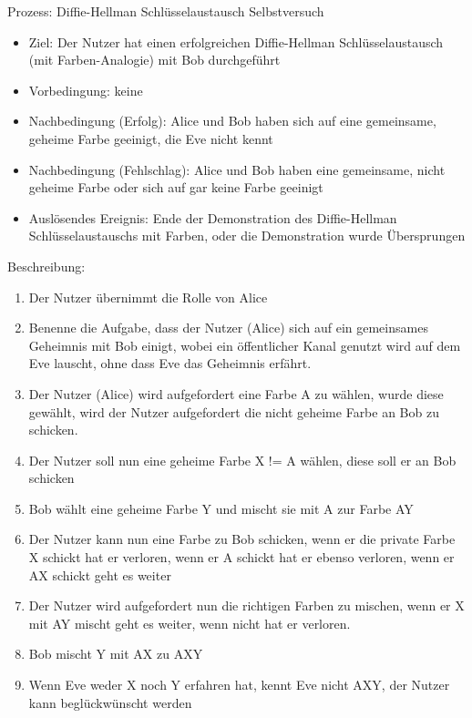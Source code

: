\documentclass{article}
\begin{document}
\begin{FA}[start=140]
\item Prozess: Diffie-Hellman Schlüsselaustausch Selbstversuch
\end{FA}
\begin{itemize}[label={}]
    \item Ziel: Der Nutzer hat einen erfolgreichen Diffie-Hellman Schlüsselaustausch
        (mit Farben-Analogie) mit Bob durchgeführt
    \item Vorbedingung: keine
    \item Nachbedingung (Erfolg): Alice und Bob haben sich auf eine
        gemeinsame, geheime Farbe geeinigt, die Eve nicht kennt
    \item Nachbedingung (Fehlschlag): Alice und Bob haben eine gemeinsame,
        nicht geheime Farbe oder sich auf gar keine Farbe geeinigt
    \item Auslösendes Ereignis: Ende der Demonstration des Diffie-Hellman
        Schlüsselaustauschs mit Farben, oder die Demonstration wurde Übersprungen
\end{itemize}

Beschreibung:
\begin{enumerate}
    \item Der Nutzer übernimmt die Rolle von Alice
    \item Benenne die Aufgabe, dass der Nutzer (Alice) sich auf ein gemeinsames Geheimnis
        mit Bob einigt, wobei ein öffentlicher Kanal genutzt wird auf dem Eve lauscht,
        ohne dass Eve das Geheimnis erfährt.
    \item Der Nutzer (Alice) wird aufgefordert eine Farbe A zu wählen,
        wurde diese gewählt, wird der Nutzer aufgefordert
        die nicht geheime Farbe an Bob zu schicken.
    \item Der Nutzer soll nun eine geheime Farbe X != A wählen,
        diese soll er an Bob schicken
    \item Bob wählt eine geheime Farbe Y und mischt sie mit A zur Farbe AY
    \item Der Nutzer kann nun eine Farbe zu Bob schicken,
        wenn er die private Farbe X schickt hat er verloren,
        wenn er A schickt hat er ebenso verloren,
        wenn er AX schickt geht es weiter
    \item Der Nutzer wird aufgefordert nun die richtigen Farben zu mischen,
        wenn er X mit AY mischt geht es weiter, wenn nicht hat er verloren.
    \item Bob mischt Y mit AX zu AXY
    \item Wenn Eve weder X noch Y erfahren hat, kennt Eve nicht AXY,
        der Nutzer kann beglückwünscht werden
\end{enumerate}
\end{document}
